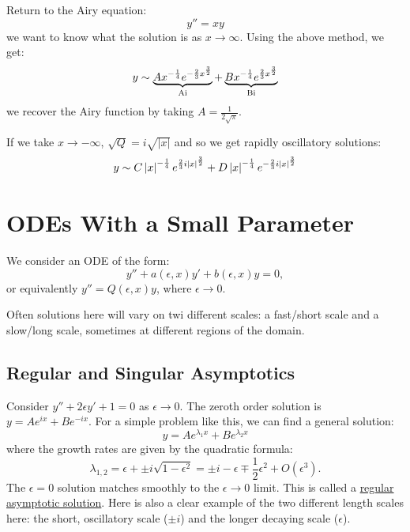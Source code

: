 \documentclass[../Main.tex]{subfiles}
\begin{document}
\begin{example}
    Return to the Airy equation:
    \begin{equation*}
        y'' = xy
    \end{equation*}
    we want to know what the solution is as $x \to\infty$. Using the above method, we get:
    \begin{equation}
        y \sim \underbrace{Ax^{-\frac14} e^{-\frac23 x^{\frac32}}}_{\operatorname{Ai}} + \underbrace{Bx^{-\frac14} e^{\frac23 x^{\frac32}}}_{\operatorname{Bi}}
        \label{eqnAiryPosX}
    \end{equation}
    we recover the Airy function by taking $A = \frac1{2\sqrt{\pi}}$.

    If we take $x \to -\infty$, $\sqrt{Q} = i\sqrt{|x|}$ and so we get rapidly oscillatory solutions:
    \begin{equation}
        y \sim C\left|x\right|^{-\frac14} e^{\frac23 i\left|x\right|^{\frac32}} + D\left|x\right|^{-\frac14} e^{-\frac23 i\left|x\right|^{\frac32}}
        \label{eqnAiryNegX}
    \end{equation}
\end{example}
\section{ODEs With a Small Parameter}
We consider an ODE of the form:
\begin{equation}
    y'' + a(\epsilon, x) y' + b(\epsilon, x) y = 0,
    \label{eqnODESmallE}
\end{equation}
or equivalently $y'' = Q(\epsilon, x) y$, where $\epsilon \to 0$.

Often solutions here will vary on twi different scales: a fast/short scale and a slow/long scale, sometimes at different regions of the domain.

\subsection{Regular and Singular Asymptotics}
Consider $y'' + 2\epsilon y' + 1 = 0$ as $\epsilon \to 0$. The zeroth order solution is $y = Ae^{ix} + Be^{-ix}$. For a simple problem like this, we can find a general solution:
\begin{equation*}
    y = Ae^{\lambda_1 x} + Be^{\lambda_2 x}
\end{equation*}
where the growth rates are given by the quadratic formula:
\begin{equation*}
    \lambda_{1, 2} = \epsilon + \pm i \sqrt{1-\epsilon^2} = \pm i - \epsilon \mp \frac12\epsilon^2 + O(\epsilon^3).
\end{equation*}
The $\epsilon = 0$ solution matches smoothly to the $\epsilon \to 0$ limit. This is called a \underline{regular asymptotic solution}. Here is also a clear example of the two different length scales here: the short, oscillatory scale ($\pm i$) and the longer decaying scale ($\epsilon$).
\end{document}
